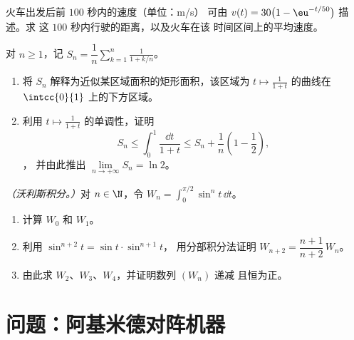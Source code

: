 \begin{exercise}[$\star\star$]\label{exo:g12:integ:7}
火车出发后前 $100$ 秒内的速度（单位：m/s）
可由 $v(t) = 30\bigl(1 - \eu^{-t/50}\bigr)$ 描述。求
这 $100$ 秒内行驶的距离，以及火车在该
时间区间上的平均速度。
\end{exercise}

\begin{exercise}[$\star\star\star$]\label{exo:g12:integ:8}
对 $n \geq 1$，记 $S_n = \dfrac1n \displaystyle\sum_{k=1}^{n} \frac{1}{1 + k/n}$。
\begin{enumerate}
  \item 将 $S_n$ 解释为近似某区域面积的矩形面积，该区域为
        $t \mapsto \frac{1}{1+t}$ 的曲线在 $\intcc{0}{1}$ 上的下方区域。
  \item 利用 $t \mapsto \frac{1}{1+t}$ 的单调性，证明
        \[
        S_n \leq \int_0^1 \frac{\dd t}{1+t} \leq S_n + \frac1n\left(1 - \frac12\right),
        \]，
        并由此推出 $\lim\limits_{n\to+\infty} S_n = \ln 2$。
\end{enumerate}
\end{exercise}

\begin{exercise}[$\star\star\star$]\label{exo:g12:integ:9}
\emph{（沃利斯积分。）}对 $n \in \N$，令
$W_n = \displaystyle\int_0^{\pi/2} \sin^n t\,\dd t$。
\begin{enumerate}
  \item 计算 $W_0$ 和 $W_1$。
  \item 利用 $\sin^{n+2}t = \sin t \cdot \sin^{n+1} t$，
        用分部积分法证明 $W_{n+2} = \dfrac{n+1}{n+2}\,W_n$。
  \item 由此求 $W_2$、$W_3$、$W_4$，并证明数列 $(W_n)$ 递减
        且恒为正。
\end{enumerate}
\end{exercise}

\section{问题：阿基米德对阵机器}

